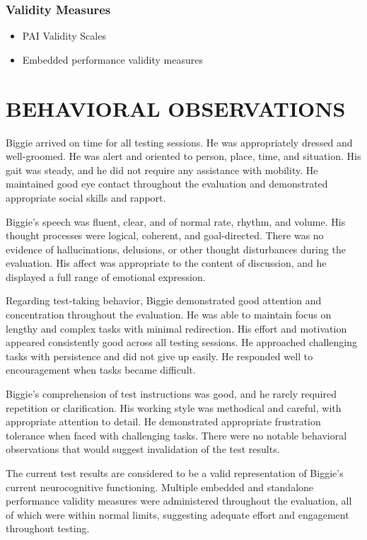\documentclass[
  letterpaper,
  DIV=11,
  numbers=noendperiod]{scrartcl}
\providecommand{\tightlist}{%
  \setlength{\itemsep}{0pt}\setlength{\parskip}{0pt}}
\begin{document}
\subsubsection{Validity Measures}\label{validity-measures}

\begin{itemize}
\tightlist
\item
  PAI Validity Scales
\item
  Embedded performance validity measures
\end{itemize}

\section{BEHAVIORAL OBSERVATIONS}\label{behavioral-observations}

Biggie arrived on time for all testing sessions. He was appropriately
dressed and well-groomed. He was alert and oriented to person, place,
time, and situation. His gait was steady, and he did not require any
assistance with mobility. He maintained good eye contact throughout the
evaluation and demonstrated appropriate social skills and rapport.

Biggie's speech was fluent, clear, and of normal rate, rhythm, and
volume. His thought processes were logical, coherent, and goal-directed.
There was no evidence of hallucinations, delusions, or other thought
disturbances during the evaluation. His affect was appropriate to the
content of discussion, and he displayed a full range of emotional
expression.

Regarding test-taking behavior, Biggie demonstrated good attention and
concentration throughout the evaluation. He was able to maintain focus
on lengthy and complex tasks with minimal redirection. His effort and
motivation appeared consistently good across all testing sessions. He
approached challenging tasks with persistence and did not give up
easily. He responded well to encouragement when tasks became difficult.

Biggie's comprehension of test instructions was good, and he rarely
required repetition or clarification. His working style was methodical
and careful, with appropriate attention to detail. He demonstrated
appropriate frustration tolerance when faced with challenging tasks.
There were no notable behavioral observations that would suggest
invalidation of the test results.

The current test results are considered to be a valid representation of
Biggie's current neurocognitive functioning. Multiple embedded and
standalone performance validity measures were administered throughout
the evaluation, all of which were within normal limits, suggesting
adequate effort and engagement throughout testing.
\end{document}

